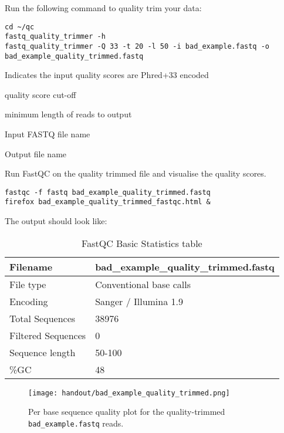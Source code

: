 \begin{steps}
Run the following command to quality trim your data:
\begin{lstlisting}
cd ~/qc
fastq_quality_trimmer -h
fastq_quality_trimmer -Q 33 -t 20 -l 50 -i bad_example.fastq -o bad_example_quality_trimmed.fastq
\end{lstlisting}
\end{steps}

\begin{note}
\begin{description}[style=multiline,labelindent=0cm,align=right,leftmargin=\descriptionlabelspace,rightmargin=1.5cm,font=\ttfamily]
 \item[-Q 33] Indicates the input quality scores are Phred+33 encoded
 \item[-t] quality score cut-off
 \item[-l] minimum length of reads to output
 \item[-i] Input FASTQ file name
 \item[-o] Output file name
\end{description}
\end{note}

\begin{steps}
Run FastQC on the quality trimmed file and visualise the quality scores.

\begin{lstlisting}
fastqc -f fastq bad_example_quality_trimmed.fastq
firefox bad_example_quality_trimmed_fastqc.html &
\end{lstlisting}

The output should look like:

\begin{table}[H]
  \centering
  \caption{FastQC Basic Statistics table}
    \begin{tabular}{ll}
    \toprule
    Filename & bad\_example\_quality\_trimmed.fastq\\
    \midrule
    File type & Conventional base calls\\
    Encoding & Sanger / Illumina 1.9\\
    Total Sequences & 38976\\
    Filtered Sequences & 0\\
    Sequence length & 50-100\\
    \%GC & 48\\
    \bottomrule
    \end{tabular}
  \label{tab:badexamplequalitytrimmed}
\end{table}

\begin{figure}[H]
\centering
\texttt{[image: handout/bad\_example\_quality\_trimmed.png]}
\caption{Per base sequence quality plot for the quality-trimmed \texttt{bad\_example.fastq} reads.}
\label{fig:bad_example_quality_trimmed_plot}
\end{figure}

\end{steps}

